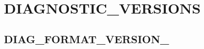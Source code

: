 \hypertarget{group___d_i_a_g_n_o_s_t_i_c___v_e_r_s_i_o_n_s}{}\section{D\+I\+A\+G\+N\+O\+S\+T\+I\+C\+\_\+\+V\+E\+R\+S\+I\+O\+NS}
\label{group___d_i_a_g_n_o_s_t_i_c___v_e_r_s_i_o_n_s}
\hypertarget{group___d_i_a_g_n_o_s_t_i_c___v_e_r_s_i_o_n_s_DIAG_FORMAT_VERSION_16}{}\subsection{D\+I\+A\+G\+\_\+\+F\+O\+R\+M\+A\+T\+\_\+\+V\+E\+R\+S\+I\+O\+N\+\_}\label{group___d_i_a_g_n_o_s_t_i_c___v_e_r_s_i_o_n_s_DIAG_FORMAT_VERSION_16}
\tabulinesep=1mm
